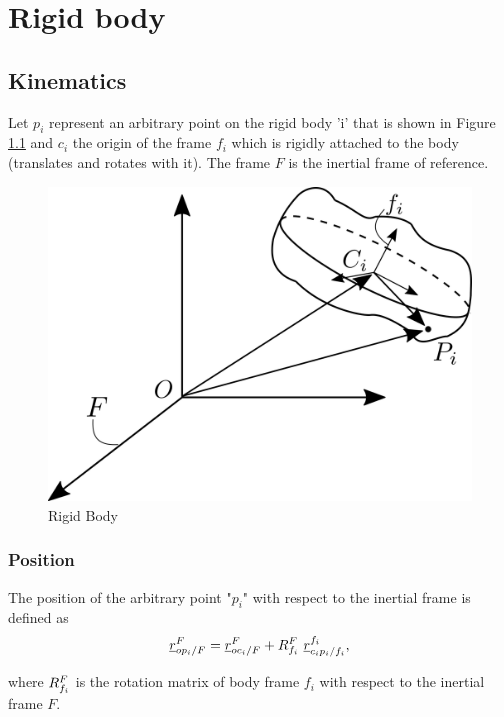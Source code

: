 \chapter{Rigid body}

\section{Kinematics}

Let $p_{i}$ represent an arbitrary point on the rigid body 'i' that is 
shown in Figure \ref{fig:rigid_body} and $c_{i}$ the origin of the  
frame $f_{i}$ which is rigidly attached to the body (translates
and rotates with it). The frame $F$ is the inertial frame of reference.

\begin{figure}[h]
    \centering\includegraphics[scale=0.2]{Images/rigid_body_diagram.png}
    \caption{Rigid Body}
    \label{fig:rigid_body}
\end{figure}


\subsection{Position}
The position of the arbitrary point "$p_{i}$" with respect to the inertial frame 
is defined as
\begin{equation}    
    \pvec{r}{op_{i}}{F}{F} = \pvec{r}{oc_{i}}{F}{F} + \rot{R}{f_{i}}{F} \  \pvec{r}{c_{i}p_{i}}{f_i}{f_i},
    \label{eq:position_rigid_body}
\end{equation}

where $\rot{R}{f_{i}}{F}$ is the rotation matrix of body frame $f_{i}$ with respect to 
the inertial frame $F$.

